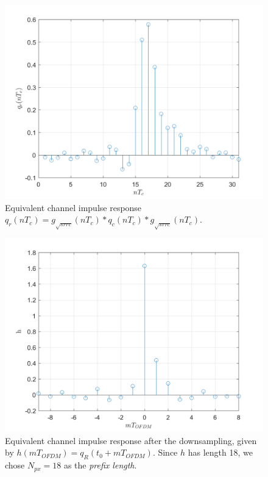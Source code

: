 \documentclass[a4paper, 12pt]{report}
\begin{document}
\begin{figure}[H]
	\centering
	\includegraphics[width=14cm]{qr}
	\caption{Equivalent channel impulse response $q_r(nT_c) = g_{\sqrt{srrc}}(nT_c)*q_c(nT_c)*g_{\sqrt{srrc}}(nT_c)$.}\label{}
\end{figure}

\begin{figure}[H]
	\centering
	\includegraphics[width=14cm]{h}
	\caption{Equivalent channel impulse response after the downsampling, given by $h(mT_{OFDM}) = q_R(t_0+mT_{OFDM})$. Since $h$ has length 18, we chose $N_{px}=18$ as the \textit{prefix length}.}
\end{figure}
\end{document}

